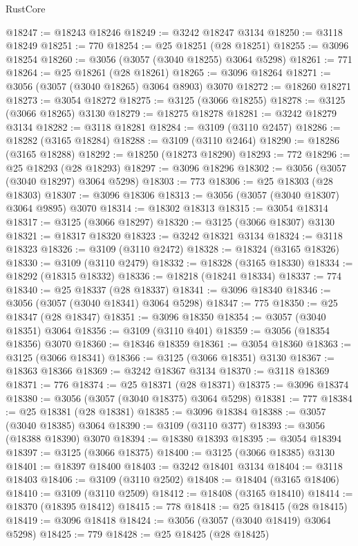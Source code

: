 \begin{lexlean}{RustCore}
\begin{coremodule}
@18247 := @18243 @18246
@18249 := @3242 @18247 @3134
@18250 := @3118 @18249
@18251 := 770
@18254 := @25 @18251 (@28 @18251)
@18255 := @3096 @18254
@18260 := @3056 (@3057 (@3040 @18255) @3064 @5298)
@18261 := 771
@18264 := @25 @18261 (@28 @18261)
@18265 := @3096 @18264
@18271 := @3056 (@3057 (@3040 @18265) @3064 @8903) @3070
@18272 := @18260 @18271
@18273 := @3054 @18272
@18275 := @3125 (@3066 @18255)
@18278 := @3125 (@3066 @18265) @3130
@18279 := @18275 @18278
@18281 := @3242 @18279 @3134
@18282 := @3118 @18281
@18284 := @3109 (@3110 @2457)
@18286 := @18282 (@3165 @18284)
@18288 := @3109 (@3110 @2464)
@18290 := @18286 (@3165 @18288)
@18292 := @18250 (@18273 @18290)
@18293 := 772
@18296 := @25 @18293 (@28 @18293)
@18297 := @3096 @18296
@18302 := @3056 (@3057 (@3040 @18297) @3064 @5298)
@18303 := 773
@18306 := @25 @18303 (@28 @18303)
@18307 := @3096 @18306
@18313 := @3056 (@3057 (@3040 @18307) @3064 @9895) @3070
@18314 := @18302 @18313
@18315 := @3054 @18314
@18317 := @3125 (@3066 @18297)
@18320 := @3125 (@3066 @18307) @3130
@18321 := @18317 @18320
@18323 := @3242 @18321 @3134
@18324 := @3118 @18323
@18326 := @3109 (@3110 @2472)
@18328 := @18324 (@3165 @18326)
@18330 := @3109 (@3110 @2479)
@18332 := @18328 (@3165 @18330)
@18334 := @18292 (@18315 @18332)
@18336 := @18218 (@18241 @18334)
@18337 := 774
@18340 := @25 @18337 (@28 @18337)
@18341 := @3096 @18340
@18346 := @3056 (@3057 (@3040 @18341) @3064 @5298)
@18347 := 775
@18350 := @25 @18347 (@28 @18347)
@18351 := @3096 @18350
@18354 := @3057 (@3040 @18351) @3064
@18356 := @3109 (@3110 @401)
@18359 := @3056 (@18354 @18356) @3070
@18360 := @18346 @18359
@18361 := @3054 @18360
@18363 := @3125 (@3066 @18341)
@18366 := @3125 (@3066 @18351) @3130
@18367 := @18363 @18366
@18369 := @3242 @18367 @3134
@18370 := @3118 @18369
@18371 := 776
@18374 := @25 @18371 (@28 @18371)
@18375 := @3096 @18374
@18380 := @3056 (@3057 (@3040 @18375) @3064 @5298)
@18381 := 777
@18384 := @25 @18381 (@28 @18381)
@18385 := @3096 @18384
@18388 := @3057 (@3040 @18385) @3064
@18390 := @3109 (@3110 @377)
@18393 := @3056 (@18388 @18390) @3070
@18394 := @18380 @18393
@18395 := @3054 @18394
@18397 := @3125 (@3066 @18375)
@18400 := @3125 (@3066 @18385) @3130
@18401 := @18397 @18400
@18403 := @3242 @18401 @3134
@18404 := @3118 @18403
@18406 := @3109 (@3110 @2502)
@18408 := @18404 (@3165 @18406)
@18410 := @3109 (@3110 @2509)
@18412 := @18408 (@3165 @18410)
@18414 := @18370 (@18395 @18412)
@18415 := 778
@18418 := @25 @18415 (@28 @18415)
@18419 := @3096 @18418
@18424 := @3056 (@3057 (@3040 @18419) @3064 @5298)
@18425 := 779
@18428 := @25 @18425 (@28 @18425)

\end{coremodule}
\end{lexlean}

